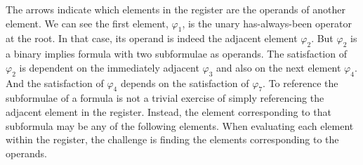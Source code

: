 The arrows indicate which elements in the register are the operands of another element.  We can see the first element, $\varphi_1$, is the unary has-always-been operator at the root.  In that case, its operand is indeed the adjacent element $\varphi_2$.  But $\varphi_2$ is a binary implies formula with two subformulae as operands.  The satisfaction of $\varphi_2$ is dependent on the immediately adjacent $\varphi_3$ and also on the next element $\varphi_4$.  And the satisfaction of $\varphi_4$ depends on the satisfaction of $\varphi_7$.  To reference the subformulae of a formula is not a trivial exercise of simply referencing the adjacent element in the register.  Instead, the element corresponding to that subformula may be any of the following elements.  When evaluating each element within the register, the challenge is finding the elements corresponding to the operands.

